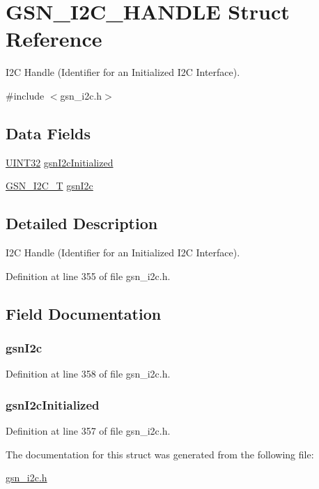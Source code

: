 \hypertarget{a00100}{
\section{GSN\_\-I2C\_\-HANDLE Struct Reference}
\label{a00100}
}


I2C Handle (Identifier for an Initialized I2C Interface).  




{\ttfamily \#include $<$gsn\_\-i2c.h$>$}

\subsection*{Data Fields}
\begin{DoxyCompactItemize}
\item 
\hyperlink{a00660_gae1e6edbbc26d6fbc71a90190d0266018}{UINT32} \hyperlink{a00100_a58bebb235abe26c2e1308a85d24a68ab}{gsnI2cInitialized}
\item 
\hyperlink{a00098}{GSN\_\-I2C\_\-T} \hyperlink{a00100_aa556a8b20f097f8d4433a0a984bd2cf9}{gsnI2c}
\end{DoxyCompactItemize}


\subsection{Detailed Description}
I2C Handle (Identifier for an Initialized I2C Interface). 

Definition at line 355 of file gsn\_\-i2c.h.



\subsection{Field Documentation}
\hypertarget{a00100_aa556a8b20f097f8d4433a0a984bd2cf9}{
\subsubsection[{gsnI2c}]{ {\bf gsnI2c}}}
\label{a00100_aa556a8b20f097f8d4433a0a984bd2cf9}


Definition at line 358 of file gsn\_\-i2c.h.

\hypertarget{a00100_a58bebb235abe26c2e1308a85d24a68ab}{
\subsubsection[{gsnI2cInitialized}]{ {\bf gsnI2cInitialized}}}
\label{a00100_a58bebb235abe26c2e1308a85d24a68ab}


Definition at line 357 of file gsn\_\-i2c.h.



The documentation for this struct was generated from the following file:\begin{DoxyCompactItemize}
\item 
\hyperlink{a00516}{gsn\_\-i2c.h}\end{DoxyCompactItemize}
